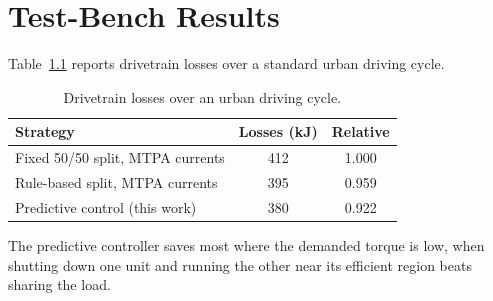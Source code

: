 \chapter{Test-Bench Results}
\label{ch:results}

Table~\ref{tab:losses} reports drivetrain losses over a standard urban driving cycle.

\begin{table}[htbp]
  \centering
  \caption{Drivetrain losses over an urban driving cycle.}
  \label{tab:losses}
  \begin{tabular}{lcc}
    \toprule
    Strategy & Losses (kJ) & Relative \\
    \midrule
    Fixed 50/50 split, MTPA currents & 412 & 1.000 \\
    Rule-based split, MTPA currents  & 395 & 0.959 \\
    Predictive control (this work)   & 380 & 0.922 \\
    \bottomrule
  \end{tabular}
\end{table}

The predictive controller saves most where the demanded torque is low, when shutting down one
unit and running the other near its efficient region beats sharing the load.
